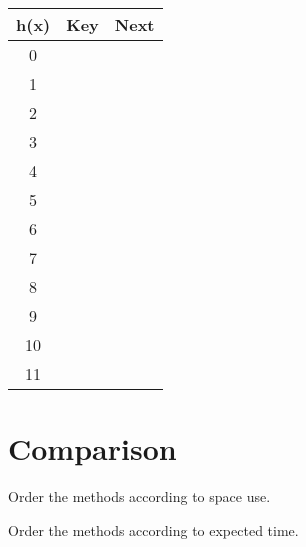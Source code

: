 \begin{tabular}{|c|c|c|}
\hline
h(x) & Key & Next \\ \hline\hline
0 & \hspace{1cm} & \hspace{1cm} \\ \hline
1 & \hspace{1cm} & \hspace{1cm} \\ \hline
2 & \hspace{1cm} & \hspace{1cm} \\ \hline
3 & \hspace{1cm} & \hspace{1cm} \\ \hline
4 & \hspace{1cm} & \hspace{1cm} \\ \hline
5 & \hspace{1cm} & \hspace{1cm} \\ \hline
6 & \hspace{1cm} & \hspace{1cm} \\ \hline
7 & \hspace{1cm} & \hspace{1cm} \\ \hline\hline
8 & \hspace{1cm} & \hspace{1cm} \\ \hline
9 & \hspace{1cm} & \hspace{1cm} \\ \hline
10 & \hspace{1cm} & \hspace{1cm} \\ \hline
11 & \hspace{1cm} & \hspace{1cm} \\ \hline
\end{tabular}

\clearpage

\section*{Comparison}
Order the methods according to space use.

\vspace{3cm}
\noindent Order the methods according to expected time.

